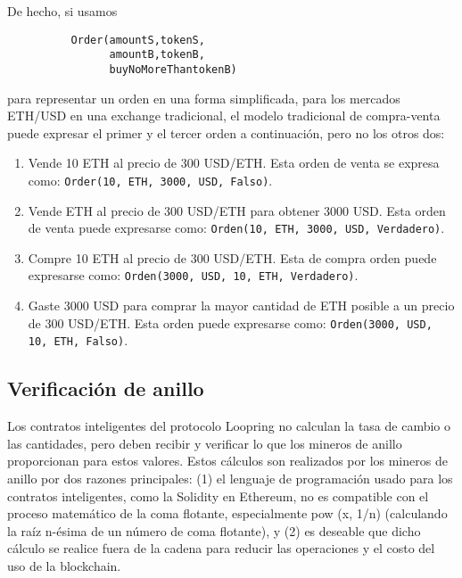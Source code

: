 \documentclass[UTF8,nofonts]{article}
\begin{document}
\begin{multicols}{2}
De hecho, si usamos


\begin{verbatim}
	      Order(amountS,tokenS,
	            amountB,tokenB,
	            buyNoMoreThantokenB)
\end{verbatim}

para representar un orden en una forma simplificada, para los mercados ETH/USD en una exchange tradicional, el modelo tradicional de compra-venta puede expresar el primer y el tercer orden a continuaci\'on, pero no los otros dos:

\begin{enumerate}
	\item Vende 10 ETH al precio de 300 USD/ETH. Esta orden de venta se expresa como: \verb|Order(10, ETH, 3000, USD, Falso)|.
	\item Vende ETH al precio de 300 USD/ETH para obtener 3000 USD. Esta orden de venta puede expresarse como: \verb|Orden(10, ETH, 3000, USD, Verdadero)|.
	\item Compre 10 ETH al precio de 300 USD/ETH. Esta de compra orden puede expresarse como: 
	\verb|Orden(3000, USD, 10, ETH, Verdadero)|.
	\item Gaste 3000 USD para comprar la mayor cantidad de ETH posible a un precio de 300 USD/ETH. Esta orden puede expresarse como: \verb|Orden(3000, USD, 10, ETH, Falso)|.
\end{enumerate}

\subsection{Verificaci\'on de anillo\label{sec:ring_verification}}

Los contratos inteligentes del protocolo Loopring no calculan la tasa de cambio o las cantidades, pero deben recibir y verificar lo que los mineros de anillo proporcionan para estos valores. Estos c\'alculos son realizados por los mineros de anillo por dos razones principales: (1) el lenguaje de programaci\'on usado para los contratos inteligentes, como la Solidity \cite{dannen2017introducing} en Ethereum, no es compatible con el proceso matem\'atico de la coma flotante, especialmente pow (x, 1/n) (calculando la ra\'iz n-\'esima de un n\'umero de coma flotante), y (2) es deseable que dicho c\'alculo se realice fuera de la cadena para reducir las operaciones y el costo del uso de la blockchain.



\end{multicols}
\end{document}
